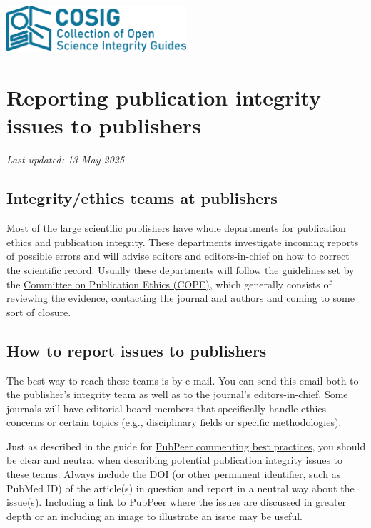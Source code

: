 \documentclass[letterpaper, 12pt]{article}
\begin{document}
\flushleft
\includegraphics[width=0.5\textwidth]{img/home/241017_final_logo_mockup.png}

\section*{Reporting publication integrity issues to publishers}
\textit{Last updated: 13 May 2025}

\subsection*{Integrity/ethics teams at publishers}

Most of the large scientific publishers have whole departments for publication ethics and publication integrity. These departments investigate incoming reports of possible errors and will advise editors and editors-in-chief on how to correct the scientific record. Usually these departments will follow the guidelines set by the \href{https://publicationethics.org/}{Committee on Publication Ethics (COPE)}, which generally consists of reviewing the evidence, contacting the journal and authors and coming to some sort of closure.

\subsection*{How to report issues to publishers}

The best way to reach these teams is by e-mail. You can send this email both to the publisher's integrity team as well as to the journal's editors-in-chief. Some journals will have editorial board members that specifically handle ethics concerns or certain topics (e.g., disciplinary fields or specific methodologies).

Just as described in the guide for \href{https://osf.io/sghaq}{PubPeer commenting best practices}, you should be clear and neutral when describing potential publication integrity issues to these teams. Always include the \href{https://www.doi.org/}{DOI} (or other permanent identifier, such as PubMed ID) of the article(s) in question and report in a neutral way about the issue(s). Including a link to PubPeer where the issues are discussed in greater depth or an including an image to illustrate an issue may be useful.
\end{document}
